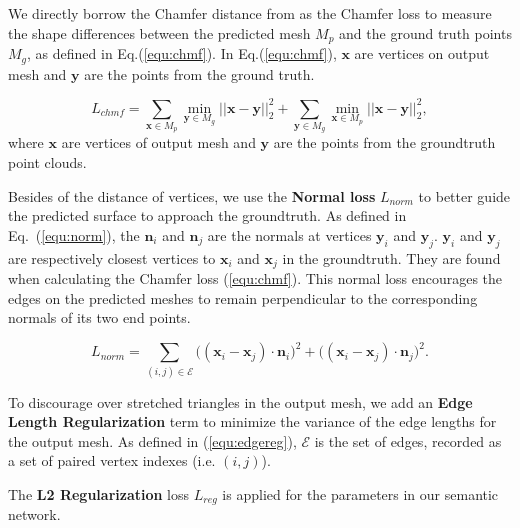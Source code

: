 We directly borrow the Chamfer distance from \cite{PSGN} as the Chamfer loss to measure the shape differences between the predicted mesh $M_p$ and the ground truth points $M_g$, as defined in Eq.(\ref{equ:chmf}).
%
In Eq.(\ref{equ:chmf}), $\mathbf{x}$ are vertices on output mesh and $\mathbf{y}$ are the points from the ground truth.

\begin{equation}
\label{equ:chmf}
L_{chmf} = \sum_{\mathbf{x}\in M_p} \min_{\mathbf{y} \in M_g}||\mathbf{x}-\mathbf{y}||_2^2 + 
\sum_{\mathbf{y} \in M_g} \min_{\mathbf{x}\in M_p}||\mathbf{x}-\mathbf{y}||_2^2,
\end{equation}
where $\mathbf{x}$ are vertices of output mesh and $\mathbf{y}$ are the points from the groundtruth point clouds.

Besides of the distance of vertices, we use the {\textbf{Normal loss}} $L_{norm}$ to better guide the predicted surface to approach the groundtruth.
As defined in Eq.~(\ref{equ:norm}), the $\mathbf{n}_{i}$ and $\mathbf{n}_{j}$ are the normals at vertices $\mathbf{y}_i$ and $\mathbf{y}_j$. 
$\mathbf{y}_i$ and $\mathbf{y}_j$ are respectively closest vertices to $\mathbf{x}_i$ and $\mathbf{x}_j$ in the groundtruth. 
They are found when calculating the Chamfer loss (\ref{equ:chmf}). 
This normal loss encourages the edges on the predicted meshes to remain perpendicular to the corresponding normals of its two end points.

\begin{equation}
\label{equ:norm}
L_{norm} = \sum_{(i,j)\in\mathcal{E}}\big((\mathbf{x}_i-\mathbf{x}_j)\cdot\mathbf{n}_{i}\big)^2 + \big( (\mathbf{x}_i-\mathbf{x}_j)\cdot \mathbf{n}_j\big)^2.
\end{equation}

To discourage over stretched triangles in the output mesh, we add an \textbf{Edge Length Regularization} term to minimize the variance of the edge lengths for the output mesh.
As defined in (\ref{equ:edgereg}), $\mathcal{E}$ is the set of edges, recorded as a set of paired vertex indexes (i.e. $(i,j)$).

The \textbf{L2 Regularization} loss $L_{reg}$ is applied for the parameters in our semantic network.


